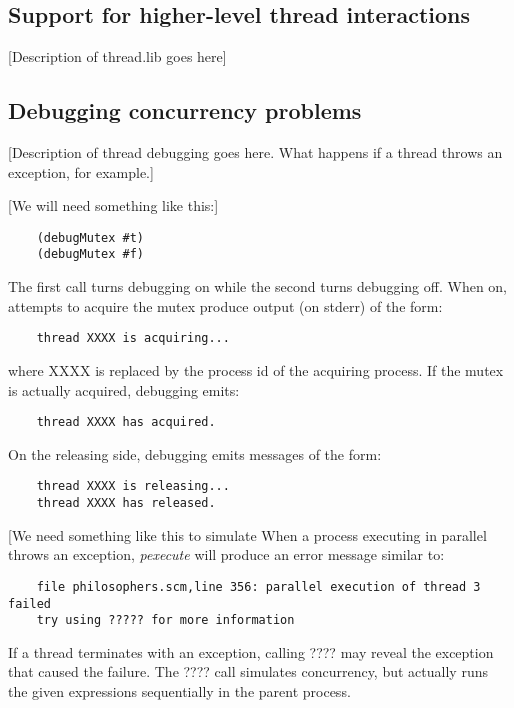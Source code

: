 \subsection{Support for higher-level thread interactions}

[Description of thread.lib goes here]

\subsection{Debugging concurrency problems}

[Description of thread debugging goes here. What happens if a 
thread throws an exception, for example.]

[We will need something like this:]

\begin{verbatim}
    (debugMutex #t)
    (debugMutex #f)
\end{verbatim}

The first call turns debugging on while the second turns debugging off. When
on, attempts to acquire the mutex produce output (on stderr) of
the form:

\begin{verbatim}
    thread XXXX is acquiring...
\end{verbatim}

where XXXX is replaced by the process id of the acquiring process.
If the mutex is actually acquired, debugging emits:

\begin{verbatim}
    thread XXXX has acquired.
\end{verbatim}

On the releasing side, debugging emits messages of the form:

\begin{verbatim}
    thread XXXX is releasing...
    thread XXXX has released.
\end{verbatim}

[We need something like this to simulate 
When a process executing in parallel throws an exception, {\it pexecute} will
produce an error message similar to:

\begin{verbatim}
    file philosophers.scm,line 356: parallel execution of thread 3 failed
    try using ????? for more information
\end{verbatim}

If a thread terminates with an exception,
calling ???? may reveal the
exception that caused the failure.
The ???? call simulates concurrency, but actually runs the
given expressions sequentially in the parent process.
